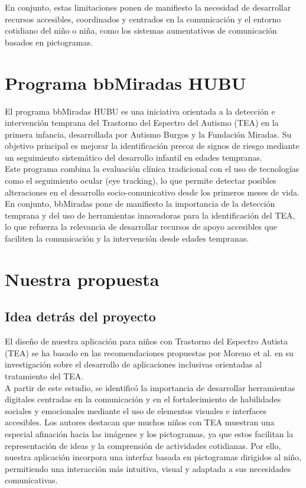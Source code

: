 \documentclass{article}
\begin{document}
En conjunto, estas limitaciones ponen de manifiesto la necesidad de desarrollar recursos accesibles, coordinados y centrados en la comunicación y el entorno cotidiano del niño o niña, como los sistemas aumentativos de comunicación basados en pictogramas.


\section{\textbf{Programa bbMiradas HUBU}}
El programa bbMiradas HUBU es una iniciativa orientada a la detección e intervención temprana del Trastorno del Espectro del Autismo (TEA) en la primera infancia, desarrollada por Autismo Burgos y la Fundación Miradas. Su objetivo principal es mejorar la identificación precoz de signos de riesgo mediante un seguimiento sistemático del desarrollo infantil en edades tempranas.\\

Este programa combina la evaluación clínica tradicional con el uso de tecnologías como el seguimiento ocular (eye tracking), lo que permite detectar posibles alteraciones en el desarrollo socio-comunicativo desde los primeros meses de vida.\\

En conjunto, bbMiradas pone de manifiesto la importancia de la detección temprana y del uso de herramientas innovadoras para la identificación del TEA, lo que refuerza la relevancia de desarrollar recursos de apoyo accesibles que faciliten la comunicación y la intervención desde edades tempranas.

\section{\textbf{Nuestra propuesta}}
\subsection{\textbf{Idea detrás del proyecto}}
El diseño de nuestra aplicación para niños con Trastorno del Espectro Autista (TEA) se ha basado en las recomendaciones propuestas por Moreno et al. en su investigación sobre el desarrollo de aplicaciones inclusivas orientadas al tratamiento del TEA.\\ 

A partir de este estudio, se identificó la importancia de desarrollar herramientas digitales centradas en la comunicación y en el fortalecimiento de habilidades sociales y emocionales mediante el uso de elementos visuales e interfaces accesibles. Los autores destacan que muchos niños con TEA muestran una especial afinación hacia las imágenes y los pictogramas, ya que estos facilitan la representación de ideas y la comprensión de actividades cotidianas. Por ello, nuestra aplicación incorpora una interfaz basada en pictogramas dirigidos al niño, permitiendo una interacción más intuitiva, visual y adaptada a sus necesidades comunicativas.\\
\end{document}
